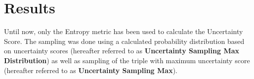 \section{Results}

Until now, only the Entropy metric has been used to calculate the Uncertainty Score.
The sampling was done using a calculated probability distribution based on uncertainty scores (hereafter referred to as \textbf{Uncertainty Sampling Max Distribution}) as well as sampling of the triple with maximum uncertainty score (hereafter referred to as \textbf{Uncertainty Sampling Max}).



\newpage



\newpage



\newpage



\newpage








